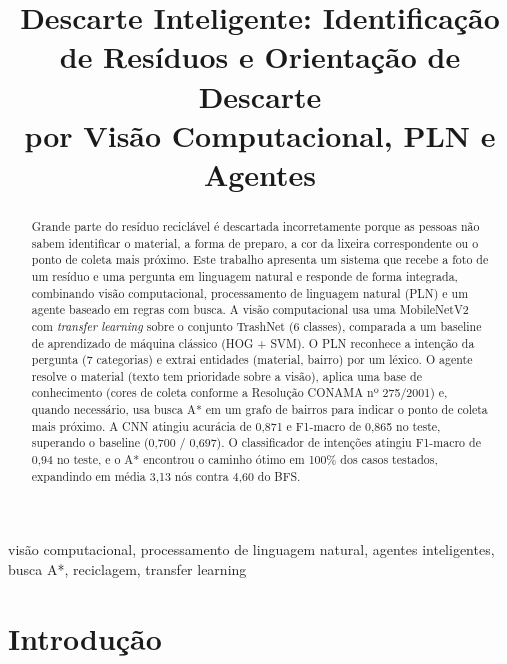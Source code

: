 \documentclass[conference]{IEEEtran}
\begin{document}
\title{Descarte Inteligente: Identificação de Resíduos e Orientação de Descarte\\ por Visão Computacional, PLN e Agentes}

\author{
}

\maketitle

\begin{abstract}
Grande parte do resíduo reciclável é descartada incorretamente porque as pessoas não sabem
identificar o material, a forma de preparo, a cor da lixeira correspondente ou o ponto de
coleta mais próximo. Este trabalho apresenta um sistema que recebe a foto de um resíduo e
uma pergunta em linguagem natural e responde de forma integrada, combinando visão
computacional, processamento de linguagem natural (PLN) e um agente baseado em regras com
busca. A visão computacional usa uma MobileNetV2 com \textit{transfer learning} sobre o
conjunto TrashNet (6 classes), comparada a um baseline de aprendizado de máquina clássico
(HOG + SVM). O PLN reconhece a intenção da pergunta (7 categorias) e extrai entidades
(material, bairro) por um léxico. O agente resolve o material (texto tem prioridade sobre a
visão), aplica uma base de conhecimento (cores de coleta conforme a Resolução CONAMA
nº 275/2001) e, quando necessário, usa busca A* em um grafo de bairros para indicar o ponto
de coleta mais próximo. A CNN atingiu acurácia de 0,871 e F1-macro de 0,865 no teste,
superando o baseline (0,700 / 0,697). O classificador de intenções atingiu F1-macro de 0,94
no teste, e o A* encontrou o caminho ótimo em 100\% dos casos testados, expandindo em média
3,13 nós contra 4,60 do BFS.
\end{abstract}

\begin{IEEEkeywords}
visão computacional, processamento de linguagem natural, agentes inteligentes, busca A*,
reciclagem, transfer learning
\end{IEEEkeywords}

\section{Introdução}
\end{document}
